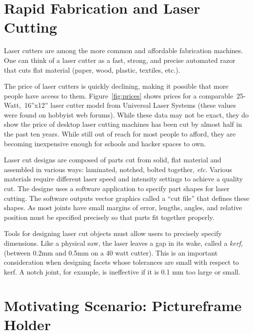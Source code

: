 \section{Rapid Fabrication and Laser Cutting}

Laser cutters are among the more common and affordable fabrication
machines. One can think of a laser cutter as a fast, strong, and
precise automated razor that cuts flat material (paper, wood, plastic,
textiles, etc.). 



The price of laser cutters is quickly declining, making it possible
that more people have access to them. Figure~\ref{fig:prices} shows
prices for a comparable~25-Watt,~16''x12'' laser cutter model from
Universal Laser Systems (these values were found on hobbyist web
forums). While these data may not be exact, they do show the price of
desktop laser cutting machines has been cut by almost half in the past
ten years. While still out of reach for most people to afford, they
are becoming inexpensive enough for schools and hacker spaces to own.

Laser cut designs are composed of parts cut from solid, flat material
and assembled in various ways: laminated, notched, bolted together,
\textit{etc}. Various materials require different laser speed and
intensity settings to achieve a quality cut. The designe uses a
software application to specify part shapes for laser cutting. The
software outputs vector graphics called a ``cut file'' that defines
these shapes. As most joints have small margins of error, lengths,
angles, and relative position must be specified precisely so that
parts fit together properly.

Tools for designing laser cut objects must allow users to precisely
specify dimensions. Like a physical saw, the laser leaves a gap in its
wake, called a \textit{kerf}, (between 0.2mm and 0.5mm on a 40 watt
cutter). This is an important consideration when designing facets
whose tolerances are small with respect to kerf. A notch joint, for
example, is ineffective if it is 0.1 mm too large or small.


\section{Motivating Scenario: Pictureframe Holder}

